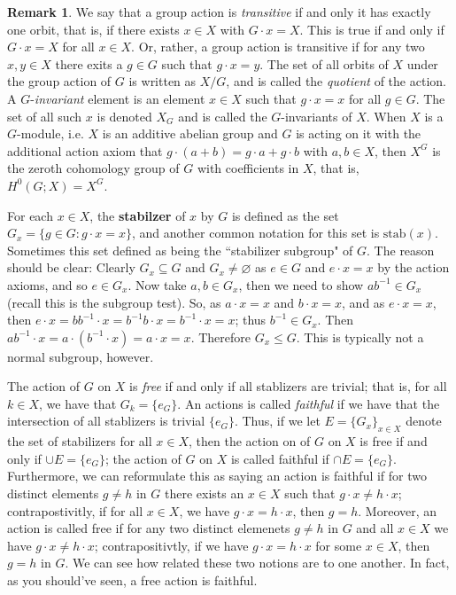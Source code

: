 \documentclass[9pt,reqno]{amsart}
\theoremstyle{definition}
\newtheorem{rem}{Remark}[section]
\begin{document}
\begin{rem}
	We say that a group action is \textit{transitive} if and only it has exactly one orbit, that is, if there exists $x \in X$ with $G \cdot x = X$. This is true if and only if $G \cdot x = X$ for all $x \in X$. Or, rather, a group action is transitive if for any two $x, y \in X$ there exits a $g \in G$ such that $g \cdot x =y$. The set of all orbits of $X$ under the group action of $G$ is written as $X/G$, and is called the \textit{quotient} of the action. A $G$-\textit{invariant} element is an element $x \in X$ such that $g \cdot x = x$ for all $g \in G$. The set of all such $x$ is denoted $X_G$ and is called the $G$-invariants of $X$. When $X$ is a $G$-module, i.e. $X$ is an additive abelian group and $G$ is acting on it with the additional action axiom that $g \cdot (a+b) = g \cdot a + g \cdot b$ with $a, b \in X$, then $X^G$ is the zeroth cohomology group of $G$ with coefficients in $X$, that is, $H^0 (G; X) = X^G$.
	
	For each $x \in X$, the \textbf{stabilzer} of $x$ by $G$ is defined as the set $G_x = \{ g \in G \colon g \cdot x = x \}$, and another common notation for this set is $\text{stab} (x)$. Sometimes this set defined as being the ``stabilizer subgroup" of $G$. The reason should be clear: Clearly $G_x \subseteq G$ and $G_x \neq \varnothing$ as $e \in G $ and $e \cdot x = x$ by the action axioms, and so $e \in G_x$. Now take $a, b \in G_x$, then we need to show $ab^{-1} \in G_x$ (recall this is the subgroup test). So, as $a \cdot x = x $ and $b \cdot x = x$, and as $e \cdot x = x$, then $e \cdot x = bb^{-1} \cdot x = b^{-1} b \cdot x = b^{-1} \cdot x = x$; thus $b^{-1} \in G_x$. Then $ab^{-1} \cdot x = a \cdot (b^{-1} \cdot x) = a \cdot x = x$. Therefore $G_x \leq G$. This is typically not a normal subgroup, however. 
	
	The action of $G$ on $X$ is \textit{free} if and only if all stablizers are trivial; that is, for all $k \in X$, we have that $G_k = \{ e_G \}$. An actions is called \textit{faithful} if we have that the intersection of all stablizers is trivial $\{ e_G \}$. Thus, if we let $E = \{G_x \}_{x \in X}$ denote the set of stabilizers for all $x \in X$, then the action on of $G$ on $X$ is free if and only if $\cup E = \{e_G \}$; the action of $G$ on $X$ is called faithful if $\cap E = \{e_G \}$. Furthermore, we can reformulate this as saying an action is faithful if for two distinct elements $g \neq h$ in $G$ there exists an $x \in X$ such that $g \cdot x \neq h \cdot x$; contrapostivitly, if for all $x \in X$, we have $g \cdot x = h \cdot x$, then $g = h$. Moreover, an action is called free if for any two distinct elemenets $g \neq h$ in $G$ and all $x \in X$ we have $g \cdot x \neq h \cdot x$; contrapositivtly, if we have $g \cdot x = h \cdot x$ for some $x \in X$, then $g = h$ in $G$. We can see how related these two notions are to one another. In fact, as you should've seen, a free action is faithful. 
\end{rem}
\end{document}
